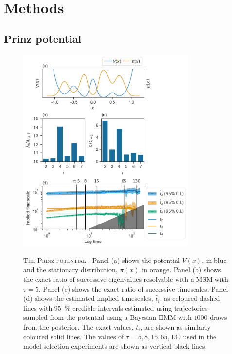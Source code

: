 \section{Methods} \label{sec:hmm_methods}
\subsection{Prinz potential}
\begin{figure}[p]
    \centering
    \caption[The Prinz potential]{\textsc{The Prinz potential} \cite{prinzMarkovModelsMolecular2011}. Panel (a) shows the potential $V(x)$, in blue and the stationary distribution, $\pi(x)$ in orange. Panel (b) shows the exact ratio of successive eigenvalues resolvable with a MSM with $\tau=5$. Panel (c) shows the exact ratio of successive timescales. Panel (d) shows the estimated implied timescales, $\hat{t}_{i}$, as coloured dashed lines with \SI{95}{\percent} credible intervals estimated using trajectories sampled from the potential using a Bayesian HMM with $1000$ draws from the posterior. The exact values, $t_{i}$, are shown as similarly coloured solid lines. The values of $\tau = 5, 8, 15, 65, 130$ used in the model selection experiments are shown as vertical black lines.}
    \includegraphics[width=0.8\textwidth]{chapters/hmm_selection/figures/prinz_pot.png}
    \label{fig:prinz_pot}
\end{figure}

